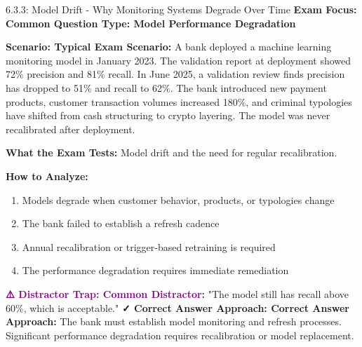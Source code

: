 \documentclass[11pt,a4paper]{beamer}
\newcommand{\examfocus}[1]{\textcolor{orange!80!black}{\textbf{Exam Focus: #1}}}
\newcommand{\trap}[1]{\textcolor{purple}{\textbf{⚠️ Distractor Trap: #1}}}
\newcommand{\correct}[1]{\textcolor{green!50!black}{\textbf{✓ Correct Answer Approach: #1}}}
\newcommand{\scenario}[1]{\textcolor{blue!70!black}{\textbf{Scenario: #1}}}
\begin{document}
	\begin{frame}{6.3.3: Model Drift - Why Monitoring Systems Degrade Over Time}
		\examfocus{Common Question Type: Model Performance Degradation}
		
		\scenario{Typical Exam Scenario:}
		A bank deployed a machine learning monitoring model in January 2023. The validation report at deployment showed 72\% precision and 81\% recall. In June 2025, a validation review finds precision has dropped to 51\% and recall to 62\%. The bank introduced new payment products, customer transaction volumes increased 180\%, and criminal typologies have shifted from cash structuring to crypto layering. The model was never recalibrated after deployment.
		
		\textbf{What the Exam Tests:} Model drift and the need for regular recalibration.
		
		\textbf{How to Analyze:}
		\begin{enumerate}
			\item Models degrade when customer behavior, products, or typologies change
			\item The bank failed to establish a refresh cadence
			\item Annual recalibration or trigger-based retraining is required
			\item The performance degradation requires immediate remediation
		\end{enumerate}
		
		\trap{Common Distractor:} "The model still has recall above 60\%, which is acceptable."
		\correct{Correct Answer Approach:} The bank must establish model monitoring and refresh processes. Significant performance degradation requires recalibration or model replacement.
	\end{frame}
	
\end{document}
